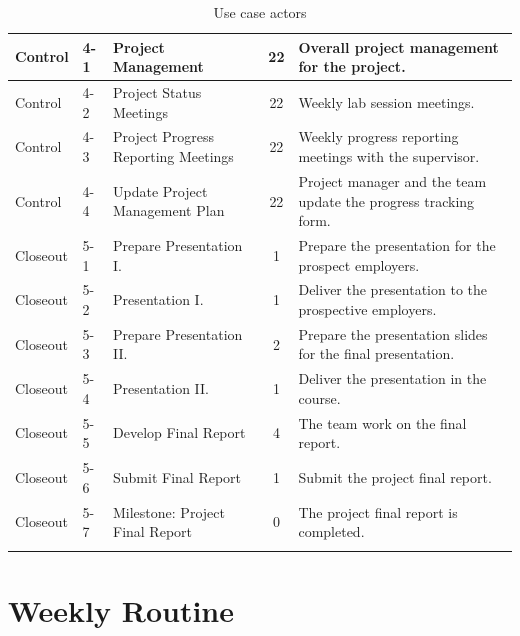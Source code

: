 \documentclass[12pt,a4paper]{article}
\begin{document}
\begin{appendices}
\begin{longtable}{p{2cm}p{1cm}p{3cm}cp{6cm}}
          Control & 4-1 & Project Management & 22 & Overall project management for the project.\\\hline
          Control & 4-2 & Project Status Meetings & 22 & Weekly lab session meetings.\\\hline
          Control & 4-3 & Project Progress Reporting Meetings & 22 & Weekly progress reporting meetings with the supervisor.\\\hline
          Control & 4-4 & Update Project Management Plan & 22 & Project manager and the team update the progress tracking form.\\\hline
          Closeout & 5-1 & Prepare Presentation I. & 1 & Prepare the presentation for the prospect employers.\\\hline
          Closeout & 5-2 & Presentation I. & 1 & Deliver the presentation to the prospective employers.\\\hline
          Closeout & 5-3 & Prepare Presentation II. & 2 & Prepare the presentation slides for the final presentation.\\\hline
          Closeout & 5-4 & Presentation II. & 1 & Deliver the presentation in the course.\\\hline
          Closeout & 5-5 & Develop Final Report & 4 & The team work on the final report.\\\hline
          Closeout & 5-6 & Submit Final Report & 1 & Submit the project final report.\\\hline
          Closeout & 5-7 & Milestone: Project Final Report & 0 & The project final report is completed.\\\hline
          \hline
          \caption{Use case actors} 
        \end{longtable} 

    \section{Weekly Routine}
      \label{appendix:weekly-routine}
      \begin{table}[H]
        \centering
        \caption{Use case actors} 
      \end{table} 
     

\end{appendices}
\end{document}
